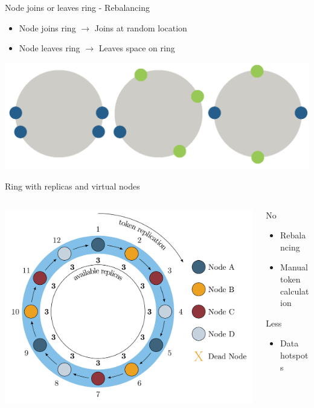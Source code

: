 \documentclass[
  10pt
]{beamer}
\begin{document}
\begin{frame}{Node joins or leaves ring - Rebalancing \cite{datastax_balancing}}
  \begin{itemize}
    \item Node joins ring $\rightarrow$ Joins at random location
    \item Node leaves ring $\rightarrow$ Leaves space on ring
  \end{itemize}
  \includegraphics[width=\textwidth]{resources/rebalancing.png}
\end{frame}

\begin{frame}{Ring with replicas and virtual nodes \cite{yelp_balancing}}
  \begin{columns}
    \begin{column}{0.7\textwidth}
      \includegraphics[width=1.0\textwidth]{resources/replica_ring.png}
    \end{column}
    \begin{column}{0.3\textwidth}
      No
      \begin{itemize}
        \item Rebalancing
        \item Manual token calculation
      \end{itemize}
      Less
      \begin{itemize}
        \item Data hotspots
      \end{itemize}
    \end{column}
  \end{columns}
\end{frame}
\end{document}

